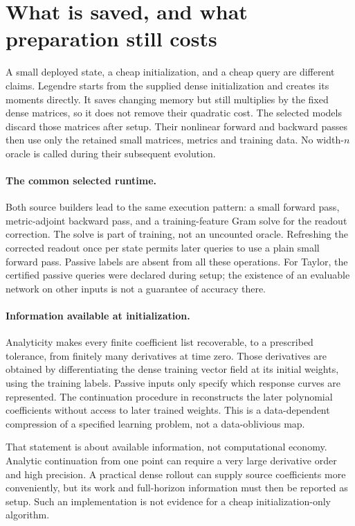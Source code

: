 \section{What is saved, and what preparation still costs}
\label{sec:costs}

A small deployed state, a cheap initialization, and a cheap query are
different claims. Legendre starts from the supplied dense initialization
and creates its moments directly. It saves changing memory but still
multiplies by the fixed dense matrices, so it does not remove their
quadratic cost. The selected models discard those matrices after setup.
Their nonlinear forward and backward passes then use only the retained
small matrices, metrics and training data. No width-$n$ oracle is called
during their subsequent evolution.

\paragraph{The common selected runtime.}
Both source builders lead to the same execution pattern: a small forward
pass, metric-adjoint backward pass, and a training-feature Gram solve for
the readout correction. The solve is part of training, not an uncounted
oracle. Refreshing the corrected readout once per state permits later
queries to use a plain small forward pass. Passive labels are absent from
all these operations. For Taylor, the certified passive queries
were declared during setup; the existence of an evaluable network on other
inputs is not a guarantee of accuracy there.

\paragraph{Information available at initialization.}
Analyticity makes every finite coefficient list recoverable, to a prescribed
tolerance, from finitely many derivatives at time zero. Those derivatives
are obtained by differentiating the dense training vector field at its
initial weights, using the training labels. Passive inputs only specify
which response curves are represented. The continuation procedure in
 reconstructs the later polynomial coefficients
without access to later trained weights. This is a data-dependent
compression of a specified learning problem, not a data-oblivious map.

That statement is about available information, not computational economy.
Analytic continuation from one point can require a very large derivative
order and high precision. A practical dense rollout can supply source
coefficients more conveniently, but its work and full-horizon information
must then be reported as setup. Such an implementation is not evidence
for a cheap initialization-only algorithm.

